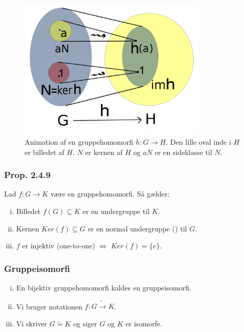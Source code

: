 \begin{figure}[h]
\begin{center}
  \includegraphics[width=0.8\textwidth]{img/group_homomorphism}
  \caption[labelInTOC]{
  Animation af en gruppehomomorfi $h: G \rightarrow H$. Den lille oval inde i
  $H$ er billedet af $H$. $N$ er kernen af $H$ og $aN$ er en sideklasse til
  $N$.}
  \label{figureLabel}
\end{center}
\end{figure}

\subsubsection{Prop. 2.4.9}
\label{2.4.9}
Lad $f: G \rightarrow K$ være en gruppehomomorfi. Så gælder:
\begin{enumerate}[(i)]
  \item Billedet $f(G) \subseteq K$ er en undergruppe til $K$.
  \item Kernen $Ker(f) \subseteq G$ er en normal undergruppe () til
  $G$.
  \item $f$ er injektiv (one-to-one) $\iff$ $Ker(f) = \{e\}$.
\end{enumerate}

\subsubsection{Gruppeisomorfi}
\label{gruppeisomorfi}
\begin{enumerate}[(i)]
    \item En bijektiv gruppehomomorfi kaldes en gruppeisomorfi.
    \item Vi bruger notationen $f: G \tilde{\rightarrow} K$.
    \item Vi skriver $G \tilde{=} K$ og siger $G$ og $K$ er isomorfe.
\end{enumerate}

